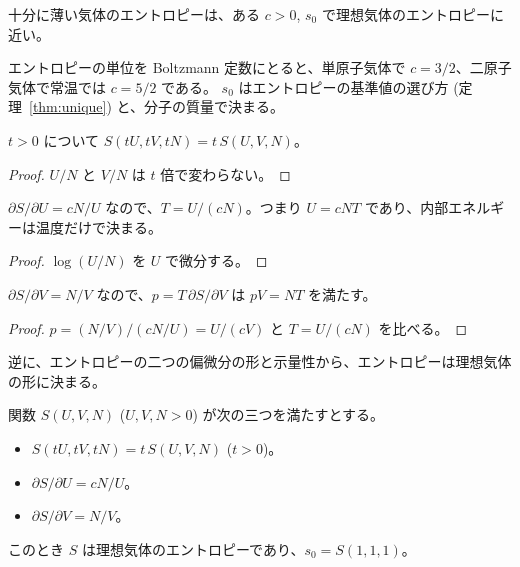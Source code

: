 \begin{empirical}[薄い気体は理想気体]
  \label{emp:dilute}
  十分に薄い気体のエントロピーは、ある $c > 0$, $s_0$ で理想気体のエントロピーに近い。
\end{empirical}

エントロピーの単位を Boltzmann 定数にとると、単原子気体で $c = 3/2$、二原子気体で常温では $c = 5/2$ である。
$s_0$ はエントロピーの基準値の選び方 (定理~\ref{thm:unique}) と、分子の質量で決まる。

\begin{theorem}[理想気体のエントロピーは示量的]
  \label{thm:ideal-gas-extensive}
  \leanok
  $t > 0$ について $S(tU, tV, tN) = t\, S(U, V, N)$。
\end{theorem}

\begin{proof}
  \leanok
  $U/N$ と $V/N$ は $t$ 倍で変わらない。
\end{proof}

\begin{theorem}[理想気体の温度]
  \label{thm:ideal-gas}
  \leanok
  $\partial S / \partial U = cN/U$ なので、$T = U/(cN)$。つまり $U = cNT$ であり、内部エネルギーは温度だけで決まる。
\end{theorem}

\begin{proof}
  \leanok
  $\log(U/N)$ を $U$ で微分する。
\end{proof}

\begin{theorem}[理想気体の状態方程式]
  \label{thm:ideal-gas-law}
  \leanok
  $\partial S / \partial V = N/V$ なので、$p = T\, \partial S/\partial V$ は $pV = NT$ を満たす。
\end{theorem}

\begin{proof}
  \leanok
  $p = (N/V) / (cN/U) = U/(cV)$ と $T = U/(cN)$ を比べる。
\end{proof}

逆に、エントロピーの二つの偏微分の形と示量性から、エントロピーは理想気体の形に決まる。

\begin{theorem}[理想気体の特徴づけ]
  \label{thm:ideal-gas-unique}
  \leanok
  関数 $S(U, V, N)$ ($U, V, N > 0$) が次の三つを満たすとする。
  \begin{itemize}
    \item $S(tU, tV, tN) = t\, S(U, V, N)$ ($t > 0$)。
    \item $\partial S/\partial U = cN/U$。
    \item $\partial S/\partial V = N/V$。
  \end{itemize}
  このとき $S$ は理想気体のエントロピーであり、$s_0 = S(1, 1, 1)$。
\end{theorem}

